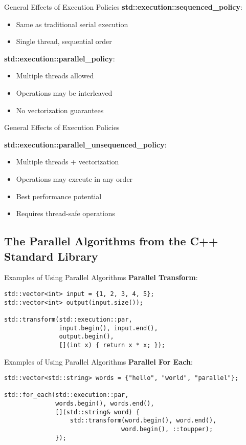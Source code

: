 \begin{frame}{General Effects of Execution Policies}
	\textbf{std::execution::sequenced\_policy}:
	\begin{itemize}
		\item Same as traditional serial execution
		\item Single thread, sequential order
	\end{itemize}

	\textbf{std::execution::parallel\_policy}:
	\begin{itemize}
		\item Multiple threads allowed
		\item Operations may be interleaved
		\item No vectorization guarantees
	\end{itemize}
\end{frame}

\begin{frame}{General Effects of Execution Policies}

	\textbf{std::execution::parallel\_unsequenced\_policy}:
	\begin{itemize}
		\item Multiple threads + vectorization
		\item Operations may execute in any order
		\item Best performance potential
		\item Requires thread-safe operations
	\end{itemize}
\end{frame}

\subsection{The Parallel Algorithms from the C++ Standard Library}
\begin{frame}[fragile]{Examples of Using Parallel Algorithms}
	\textbf{Parallel Transform}:
	\begin{verbatim}
std::vector<int> input = {1, 2, 3, 4, 5};
std::vector<int> output(input.size());

std::transform(std::execution::par,
               input.begin(), input.end(),
               output.begin(),
               [](int x) { return x * x; });
	\end{verbatim}
\end{frame}

\begin{frame}[fragile]{Examples of Using Parallel Algorithms}
	\textbf{Parallel For Each}:
	\begin{verbatim}
std::vector<std::string> words = {"hello", "world", "parallel"};

std::for_each(std::execution::par,
              words.begin(), words.end(),
              [](std::string& word) {
                  std::transform(word.begin(), word.end(),
                                word.begin(), ::toupper);
              });
	\end{verbatim}
\end{frame}


